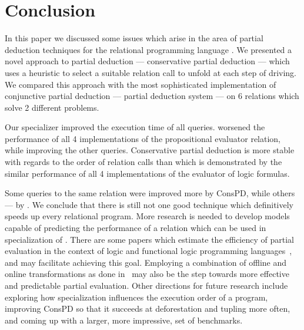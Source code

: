 \section{Conclusion}

In this paper we discussed some issues which arise in the area of partial deduction techniques for the relational programming language \mk.
We presented a novel approach to partial deduction --- conservative partial deduction --- which uses a heuristic to select a suitable relation call to unfold at each step of driving.
We compared this approach with the most sophisticated implementation of conjunctive partial deduction --- \ecce partial deduction system --- on 6 relations which solve 2 different problems.

Our specializer improved the execution time of all queries.
\ecce worsened the performance of all 4 implementations of the propositional evaluator relation, while improving the other queries.
Conservative partial deduction is more stable with regards to the order of relation calls than \ecce which is demonstrated by the similar performance of all 4 implementations of the evaluator of logic formulas.

Some queries to the same relation were improved more by ConsPD, while others --- by \ecce.
We conclude that there is still not one good technique which definitively speeds up every relational program.
More research is needed to develop models capable of predicting the performance of a relation which can be used in specialization of \mk.
There are some papers which estimate the efficiency of partial evaluation in the context of logic and functional logic programming languages~\cite{vidal2004cost,vidal2008trace}, and may facilitate achieving this goal.
Employing a combination of offline and online transformations as done in~\cite{hybrid} may also be the step towards more effective and predictable partial evaluation.
Other directions for future research include exploring how specialization influences the execution order of a \mk program, improving ConsPD so that it succeeds at deforestation and tupling more often, and coming up with a larger, more impressive, set of benchmarks.